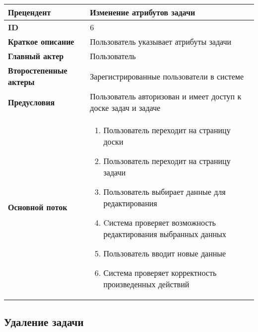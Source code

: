 \documentclass[14pt,a4paper]{extarticle}
\begin{document}
\begin{tabular}{|l|p{9cm}|}
	\hline
	\textbf{Прецендент}            & Изменение атрибутов задачи                                                  \\
	\hline
	\textbf{ID}                    & 6                                                                           \\
	\hline
	\textbf{Краткое описание}      & Пользователь указывает атрибуты задачи                			     \\
	\hline
	\textbf{Главный актер}         & Пользователь                                                                \\
	\hline
	\textbf{Второстепенные актеры} & Зарегистрированные пользователи в системе                                   \\
	\hline
	\textbf{Предусловия}           & Пользователь авторизован и имеет доступ к доске задач и задаче              \\
	\hline
	\textbf{Основной поток}        & \begin{enumerate}
		                                 \item Пользователь переходит на страницу доски
						 \item Пользователь переходит на страницу задачи
		                                 \item Пользователь выбирает данные для редактирования
					         \item Cистема проверяет возможность редактирования выбранных данных
						 \item Пользователь вводит новые данные
		                                 \item Система проверяет корректность произведенных действий
	                                 \end{enumerate} \\
	\hline
\end{tabular}

\subsection{Удаление задачи}
\end{document}

